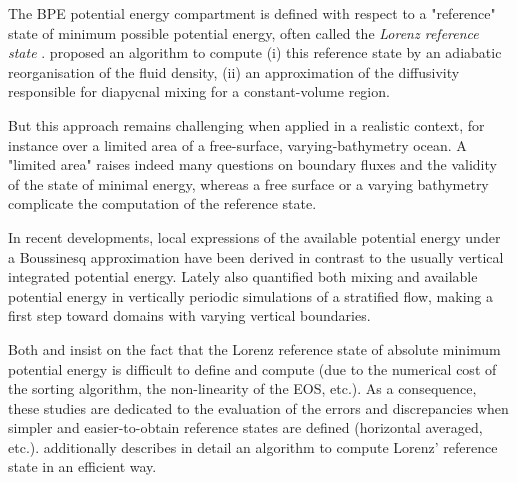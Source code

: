 The BPE potential energy compartment is defined with respect to a "reference" state of minimum possible potential energy, often called the \textit{Lorenz reference state} \citep{saenz_estimating_2015}. \cite{winters_available_1995} proposed an algorithm to compute (i) this reference state by an adiabatic reorganisation of the fluid density, (ii) an approximation of the diffusivity responsible for diapycnal mixing for a constant-volume region.


But this approach remains challenging when applied in a realistic context, for instance over a limited area of a free-surface, varying-bathymetry ocean. A "limited area" raises indeed many questions on boundary fluxes and the validity of the state of minimal energy, whereas a free surface or a varying bathymetry complicate the computation of the reference state.%


In recent developments, %
local expressions of the available potential energy under a Boussinesq approximation have been derived \citep{winters_available_2013} in contrast to the usually vertical integrated potential energy. Lately \cite{howland_mixing_2020,howland_quantifying_2020} also quantified both mixing and available potential energy in vertically periodic simulations of a stratified flow, making a first step toward domains with varying vertical boundaries. %



Both \cite{saenz_estimating_2015} and \cite{tailleux_local_2018} insist on the fact that the Lorenz reference state of absolute minimum potential energy is difficult to define and compute (due to the numerical cost of the sorting algorithm, the non-linearity of the EOS, etc.). As a consequence, these studies are dedicated to the evaluation of the errors and discrepancies when simpler and easier-to-obtain reference states are defined (horizontal averaged, etc.).  \cite{saenz_estimating_2015} additionally describes in detail an algorithm to compute Lorenz' reference state in an efficient way.\\

